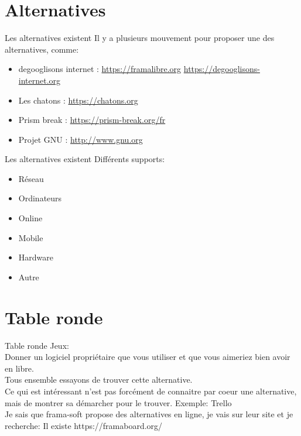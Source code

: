 \documentclass{beamer}
\begin{document}
\section{Alternatives}
\begin{frame}{Les alternatives existent}
Il y a plusieurs mouvement pour proposer une des alternatives, comme:
\begin{itemize}
	\item degooglisons internet : \url{https://framalibre.org} \url{https://degooglisons-internet.org}
	\item Les chatons : \url{https://chatons.org}
	\item Prism break : \url{https://prism-break.org/fr}
	\item Projet GNU : \url{http://www.gnu.org}
\end{itemize}
\end{frame}

\begin{frame}{Les alternatives existent}
Différents supports:
\begin{itemize}
	\item Réseau
	\item Ordinateurs
	\item Online
	\item Mobile
	\item Hardware
	\item Autre
\end{itemize}
\end{frame}




\section{Table ronde}
\begin{frame}{Table ronde}
Jeux:\\
	Donner un logiciel propriétaire que vous utiliser et que vous aimeriez bien avoir en libre.\\
	Tous ensemble essayons de trouver cette alternative.\\
	Ce qui est intéressant n'est pas forcément de connaitre par coeur une alternative, mais de montrer sa démarcher pour le trouver.\newline
	\newline
	Exemple: Trello\\
	Je sais que frama-soft propose des alternatives en ligne, je vais sur leur site et je recherche: Il existe https://framaboard.org/
\end{frame}
\end{document}

